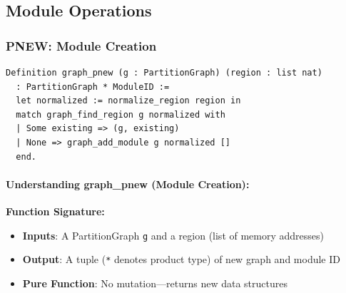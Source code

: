 \subsection{Module Operations}

\subsubsection{PNEW: Module Creation}

\begin{lstlisting}
Definition graph_pnew (g : PartitionGraph) (region : list nat)
  : PartitionGraph * ModuleID :=
  let normalized := normalize_region region in
  match graph_find_region g normalized with
  | Some existing => (g, existing)
  | None => graph_add_module g normalized []
  end.
\end{lstlisting}

\paragraph{Understanding graph\_pnew (Module Creation):}
\textbf{Function Signature:}
\begin{itemize}
    \item \textbf{Inputs}: A PartitionGraph \texttt{g} and a region (list of memory addresses)
    \item \textbf{Output}: A tuple (\texttt{*} denotes product type) of new graph and module ID
    \item \textbf{Pure Function}: No mutation—returns new data structures
\end{itemize}

